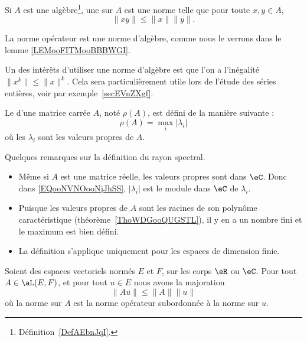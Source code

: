 \begin{definition}  \label{DefJWRWQue}
	Si \( A\) est une algèbre\footnote{Définition~\ref{DefAEbnJqI}.}, une  sur \( A\) est une norme telle que pour toute \( x,y\in A\),
	\begin{equation}
		\| xy \|\leq \| x \|\| y \|.
	\end{equation}
\end{definition}
La norme opérateur est une norme d'algèbre, comme nous le verrons dans le lemme \ref{LEMooFITMooBBBWGI}.

Un des intérêts d'utiliser une norme d'algèbre est que l'on a l'inégalité \( \| x^k \|\leq \| x \|^k \). Cela sera particulièrement utile lors de l'étude des séries entières, voir par exemple~\ref{secEVnZXgf}.

\begin{definition}      \label{DEFooEAUKooSsjqaL}
	Le  d'une matrice carrée \( A\), noté \( \rho(A)\), est défini de la manière suivante :
	\begin{equation}    \label{EQooNVNOooNjJhSS}
		\rho(A)=\max_i|\lambda_i|
	\end{equation}
	où les \( \lambda_i\) sont les valeurs propres de \( A\).
\end{definition}

\begin{normaltext}
	Quelques remarques sur la définition du rayon spectral.
	\begin{itemize}
		\item
		      Même si \( A\) est une matrice réelle, les valeurs propres sont dans \( \eC\). Donc dans \eqref{EQooNVNOooNjJhSS}, \( | \lambda_i |\) est le module dans \( \eC\) de \( \lambda_i\).
		\item
		      Puisque les valeurs propres de \( A\) sont les racines de son polynôme caractéristique (théorème~\ref{ThoWDGooQUGSTL}), il y en a un nombre fini et le maximum est bien défini.
		\item
		      La définition s'applique uniquement pour les espaces de dimension finie.
	\end{itemize}
\end{normaltext}

\begin{lemma}       \label{LEMooIBLEooLJczmu}
	Soient des espaces vectoriels normés \( E\) et \( F\), sur les corps \( \eR\) ou \( \eC\). Pour tout \( A\in \aL(E,F)\), et pour tout \( u\in E\) nous avons la majoration
	\begin{equation}
		\| Au \|\leq \| A \|\| u \|
	\end{equation}
	où la norme sur \( A\) est la norme opérateur subordonnée à la norme sur \( u\).
\end{lemma}

